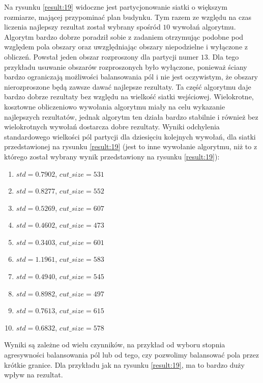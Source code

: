 Na rysunku \ref{result:19} widoczne jest partycjonowanie siatki o większym rozmiarze, mającej
przypominać plan budynku.
Tym razem ze względu na czas liczenia najlepszy rezultat został wybrany spośród $10$ wywołań algorytmu.
Algorytm bardzo dobrze poradził sobie z zadaniem otrzymując podobne pod względem pola obszary oraz uwzględniając
obszary niepodzielne i wyłączone z obliczeń.
Powstał jeden obszar rozproszony dla partycji numer $13$.
Dla tego przykładu usuwanie obszarów rozproszonych było wyłączone, ponieważ ściany bardzo
ograniczają możliwości balansowania pól i nie jest oczywistym, że obszary nierozproszone będą zawsze dawać najlepsze rezultaty.
Ta część algorytmu daje bardzo dobrze rezultaty bez względu na wielkość siatki wejściowej.
Wielokrotne, kosztowne obliczeniowo wywołania algorytmu miały na celu wykazanie najlepszych rezultatów, jednak algorytm
ten działa bardzo stabilnie i również bez wielokrotnych wywołań dostarcza dobre rezultaty.
Wyniki odchylenia standardowego wielkości pól partycji dla dziesięciu kolejnych wywołań, dla siatki przedstawionej
na rysunku \ref{result:19} (jest to inne wywołanie algorytmu, niż to z którego został wybrany wynik przedstawiony na rysunku
\ref{result:19}):
\begin{enumerate}
    \item $std = 0.7902$, $cut\_size=531$
    \item $std = 0.8277$, $cut\_size=552$
    \item $std = 0.5269$, $cut\_size=607$
    \item $std = 0.4602$, $cut\_size=473$
    \item $std = 0.3403$, $cut\_size=601$
    \item $std = 1.1961$, $cut\_size=583$
    \item $std = 0.4940$, $cut\_size=545$
    \item $std = 0.8982$, $cut\_size=497$
    \item $std = 0.7613$, $cut\_size=615$
    \item $std = 0.6832$, $cut\_size=578$
\end{enumerate}

Wyniki są zależne od wielu czynników, na przykład od wyboru stopnia agresywności balansowania pól lub od tego,
czy pozwolimy balansować pola przez krótkie granice.
Dla przykładu jak na rysunku \ref{result:19}, ma to bardzo duży wpływ na rezultat.

